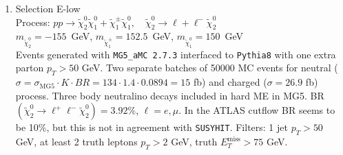 \documentclass[12pt,fleqn]{article}
\begin{document}
\begin{enumerate}
\newpage
 
\item{Selection E-low}\\
 Process: $ p p \to \tilde{\chi}_2^0 \tilde{\chi}_1^0 + \tilde{\chi}_1^\pm \tilde{\chi}_1^0 ,\quad \tilde{\chi}_2^0\to\ell+\ell^-\tilde{\chi}_2^0$\\
 $m_{\tilde{\chi}_2^0} = -155$~GeV, $m_{\tilde{\chi}_1^\pm} = 152.5$~GeV, $m_{\tilde{\chi}_1^0} = 150$~GeV\\
 Events generated with \texttt{MG5\_aMC 2.7.3} interfaced to \texttt{Pythia8} with one extra parton $p_T>50$ GeV.
 Two separate batches of 50000 MC events for neutral ($\sigma = \sigma_\textrm{MG5} \cdot K \cdot BR = 134 \cdot 1.4 \cdot 0.0894 = 15$ fb) and charged ($\sigma =  26.9$ fb) process. Three body neutralino decays included in hard ME in MG5. BR$(\tilde{\chi}_2^0\to\ell^+\ell^-\tilde{\chi}_2^0) = 3.92\%$, $\ell = e,\mu$. In the ATLAS cutflow BR seems to be 10\%, but this is not in agreement with \texttt{SUSYHIT}. Filters: 1 jet $p_T > 50$ GeV, at least 2 truth leptons $p_T > 2$ GeV, truth $E_T^\mathrm{miss} > 75$ GeV.


\end{enumerate}
\end{document}
